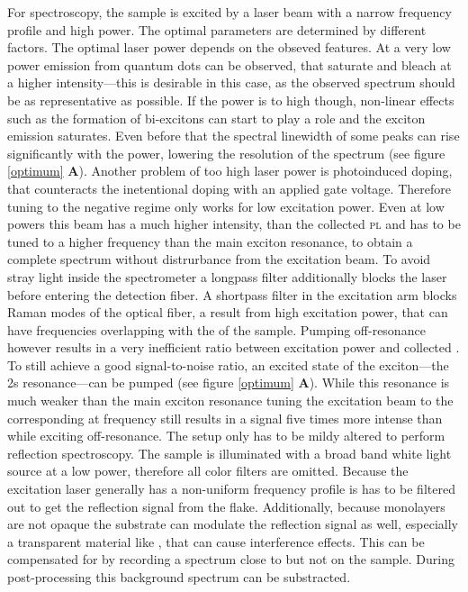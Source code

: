 For \pl spectroscopy, the sample is excited by a laser beam with a narrow frequency profile and high power. The optimal parameters are determined by different factors. The optimal laser power depends on the obseved features. At a very low power emission from quantum dots can be observed, that saturate and bleach at a higher intensity---this is desirable in this case, as the observed spectrum should be as representative as possible. If the power is to high though, non-linear effects such as the formation of bi-excitons can start to play a role and the exciton emission saturates. Even before that the spectral linewidth of some peaks can rise significantly with the power, lowering the resolution of the spectrum (see figure \ref{optimum} \textbf{A}). Another problem of too high laser power is photoinduced doping, that counteracts the inetentional doping with an applied gate voltage\cite{wang_photoinduced_2016,cunningham_photoinduced_2017}. Therefore tuning to the negative regime only works for low excitation power. Even at low powers this beam has a much higher intensity, than the collected \textsc{pl} and has to be tuned to a higher frequency than the main exciton resonance, to obtain a complete spectrum without distrurbance from the excitation beam. To avoid stray light inside the spectrometer a longpass filter additionally blocks the laser before entering the detection fiber. A shortpass filter in the excitation arm blocks Raman modes of the optical fiber, a result from high excitation power, that can have frequencies overlapping with the \pl of the sample. Pumping off-resonance however results in a very inefficient ratio between excitation power and collected \pl\!. To still achieve a good signal-to-noise ratio, an excited state of the exciton---the 2s resonance---can be pumped (see figure \ref{optimum} \textbf{A}). While this resonance is much weaker than the main exciton resonance tuning the excitation beam to the corresponding at frequency still results in a signal five times more intense than while exciting off-resonance.
The setup only has to be mildy altered to perform reflection spectroscopy. The sample is illuminated with a broad band white light source at a low power, therefore all color filters are omitted. Because the excitation laser generally has a non-uniform frequency profile is has to be filtered out to get the reflection signal from the \wse flake. Additionally, because \tmdg monolayers are not opaque the substrate can modulate the reflection signal as well, especially a transparent material like \hbn, that can cause interference effects. This can be compensated for by recording a spectrum close to but not on the sample. During post-processing this background spectrum can be substracted.

